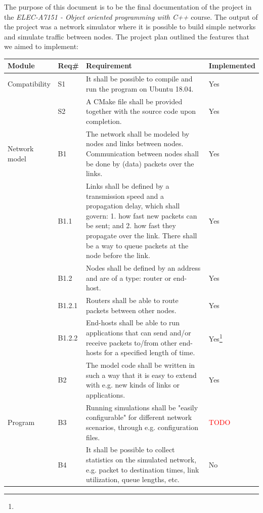 The purpose of this document is to be the final documentation of the project in the \textit{ELEC-A7151 - Object oriented programming with C++} course. The output of the project was a network simulator  where it is possible to build simple networks and simulate traffic between nodes. The project plan outlined the features that we aimed to implement:

\begin{table}[!htbp]
\footnotesize{
\begin{tabular}{p{}|p{}|p{}|p{}}
\textbf{Module} & \textbf{Req\#} & \textbf{Requirement} & \textbf{Implemented} \\
\hline Compatibility
& S1        & It shall be possible to compile and run the program on Ubuntu 18.04. & Yes\\
& S2        & A CMake file shall be provided together with the source code upon completion. & Yes\\
\hline Network model   
& B1        & The network shall be modeled by nodes and links between nodes. Communication between nodes shall be done by (data) packets over the links.  & Yes \\
& B1.1      & Links shall be defined by a transmission speed and a propagation delay, which shall govern: 1. how fast new packets can be sent; and 2. how fast they propagate over the link. There shall be a way to queue packets at the node before the link. & Yes \\
& B1.2      & Nodes shall be defined by an address and are of a type: router or end-host. & Yes\\
& B1.2.1    & Routers shall be able to route packets between other nodes. & Yes\\
& B1.2.2    & End-hosts shall be able to run applications that can send and/or receive packets to/from other end-hosts for a specified length of time. & Yes\footnote{}\\
& B2        & The model code shall be written in such a way that it is easy to extend with e.g. new kinds of links or applications. & Yes\\ 
\hline Program
& B3        & Running simulations shall be "easily configurable" for different network scenarios, through e.g. configuration files. & \textcolor{red}{TODO}\\
& B4        & It shall be possible to collect statistics on the simulated network, e.g. packet to destination times, link utilization, queue lengths, etc. & No\\

\end{tabular}}
\end{table}
